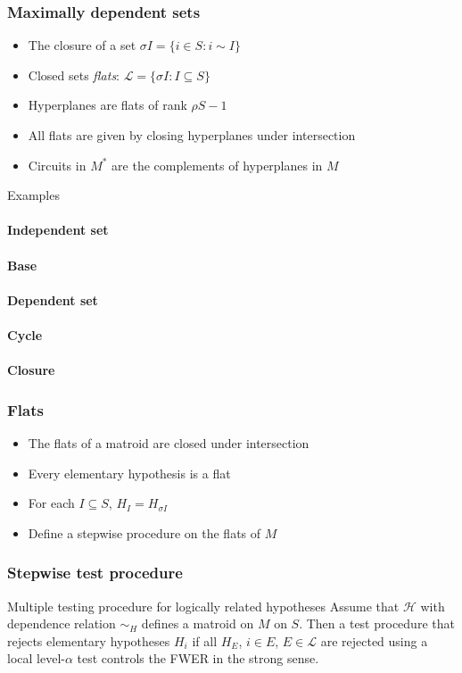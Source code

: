 \documentclass[bigger]{beamer}
\begin{document}
\begin{frame}
\frametitle{Maximally dependent sets}
\begin{itemize}
\item The closure of a set $\sigma I = \{i \in S: i \sim I\}$
\item Closed sets {\em flats}: $\mathscr{L} = \{\sigma I: I \subseteq S\}$
\item Hyperplanes are flats of rank $\rho S - 1$
\item All flats are given by closing hyperplanes under intersection
\item Circuits in $M^*$ are the complements of hyperplanes in $M$
\end{itemize} %
\end{frame}



\begin{frame}{Examples}
\framesubtitle<1>{Independent set}  
\framesubtitle<2>{Base}  
\framesubtitle<4>{Dependent set}  
\framesubtitle<3>{Cycle}  
\framesubtitle<5>{Closure}  
\end{frame}








\begin{frame}
\frametitle{Flats}
\begin{itemize}

\item The flats of a matroid are closed under intersection

\item Every elementary hypothesis is a flat
\item For each $I \subseteq S$, $H_I = H_{\sigma I}$
\item Define a stepwise procedure on the flats of $M$


\end{itemize} %
\end{frame}

\begin{frame}
  \frametitle{Stepwise test procedure}
  \begin{block}{Multiple testing procedure for logically related hypotheses}
    Assume that $\mathscr{H}$ with dependence relation $\sim_H$
    defines a matroid on $M$ on $S$. Then a test procedure that
    rejects elementary hypotheses $H_i$ if all $H_E$, $i \in E$, $E
    \in \mathscr{L}$ are rejected using a local level-$\alpha$ test
    controls the FWER in the strong sense.
  \end{block}

\end{frame}
\end{document}
